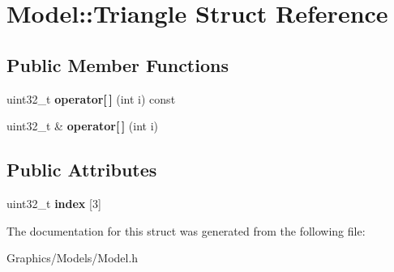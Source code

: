\hypertarget{structModel_1_1Triangle}{}\section{Model\+:\+:Triangle Struct Reference}
\label{structModel_1_1Triangle}
\subsection*{Public Member Functions}
\begin{DoxyCompactItemize}
\item 
\mbox{\label{structModel_1_1Triangle_a7abcb6e12344405e6a41b180d9165dc7}} 
uint32\+\_\+t {\bfseries operator\mbox{[}$\,$\mbox{]}} (int i) const
\item 
\mbox{\label{structModel_1_1Triangle_a3a80af3a78260793fa9baba4eee077a8}} 
uint32\+\_\+t \& {\bfseries operator\mbox{[}$\,$\mbox{]}} (int i)
\end{DoxyCompactItemize}
\subsection*{Public Attributes}
\begin{DoxyCompactItemize}
\item 
\mbox{\label{structModel_1_1Triangle_ab40a9748b63a70d5ade5a4c34ecd4851}} 
uint32\+\_\+t {\bfseries index} \mbox{[}3\mbox{]}
\end{DoxyCompactItemize}


The documentation for this struct was generated from the following file\+:\begin{DoxyCompactItemize}
\item 
Graphics/\+Models/Model.\+h\end{DoxyCompactItemize}
